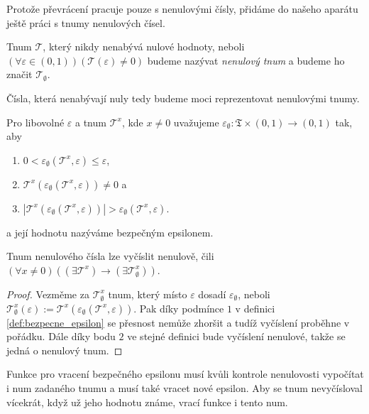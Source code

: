 Protože převrácení pracuje pouze s nenulovými čísly, přidáme do našeho aparátu ještě práci s tnumy nenulových čísel.

\begin{definition}
Tnum $\mathcal{T}$, který nikdy nenabývá nulové hodnoty, neboli $(\forall \varepsilon \in (0,1))(\mathcal{T}(\varepsilon) \neq 0)$ budeme nazývat \textit{nenulový tnum} a budeme ho značit $\mathcal{T}_\emptyset$.
\end{definition}

Čísla, která nenabývají nuly tedy budeme moci reprezentovat nenulovými tnumy.

\begin{definition}\label{def:bezpecne_epsilon}
Pro libovolné $\varepsilon$ a tnum $\mathcal{T}^x$, kde $x\neq 0$ uvažujeme  $\varepsilon_\emptyset : \mathfrak{T}\times(0,1)\to(0,1)$ tak, aby
\begin{enumerate}
\item{$0<\varepsilon_\emptyset(\mathcal{T}^x, \varepsilon)\leq\varepsilon$},
\item{$\mathcal{T}^x(\varepsilon_\emptyset(\mathcal{T}^x, \varepsilon)) \neq 0$} a
\item{$|\mathcal{T}^x(\varepsilon_\emptyset(\mathcal{T}^x, \varepsilon))| > \varepsilon_\emptyset(\mathcal{T}^x,\varepsilon)$}.
\end{enumerate}
a její hodnotu nazýváme bezpečným epsilonem.
\end{definition}

\begin{lemma}\label{vet:nenul}
Tnum nenulového čísla lze vyčíslit nenulově, čili $(\forall x \neq 0)((\exists \mathcal{T}^x) \to (\exists \mathcal{T}^x_\emptyset))$. 
\begin{proof}
Vezměme za $\mathcal{T}^x_\emptyset$ tnum, který místo $\varepsilon$ dosadí $\varepsilon_\emptyset$, neboli $\mathcal{T}^x_\emptyset(\varepsilon) := \mathcal{T}^x(\varepsilon_\emptyset(\mathcal{T}^x, \varepsilon))$. Pak díky podmínce $1$ v definici \ref{def:bezpecne_epsilon} se přesnost nemůže zhoršit a tudíž vyčíslení proběhne v pořádku. Dále díky bodu $2$ ve stejné definici bude vyčíslení nenulové, takže se jedná o nenulový tnum.
\end{proof} 
\end{lemma}

Funkce pro vracení bezpečného epsilonu musí kvůli kontrole nenulovosti vypočítat i num zadaného tnumu a musí také vracet nové epsilon. Aby se tnum nevyčísloval vícekrát, když už jeho hodnotu známe, vrací funkce i tento num.

